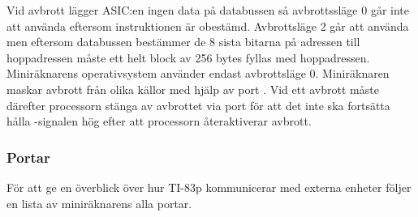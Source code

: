 \documentclass[main.tex]{subfiles}
\begin{document}
Vid avbrott lägger ASIC:en ingen data på databussen så avbrottssläge 0 går inte
att använda eftersom instruktionen är obestämd. Avbrottsläge 2 går att använda
men eftersom databussen bestämmer de 8 sista bitarna på adressen till
hoppadressen måste ett helt block av 256 bytes fyllas med hoppadressen.
Miniräknarens operativsystem använder endast avbrottsläge 0. Miniräknaren
maskar avbrott från olika källor med hjälp av port . Vid ett avbrott
måste därefter processorn stänga av avbrottet via port  för att det
inte ska fortsätta hålla -signalen hög efter att processorn
återaktiverar avbrott.

\subsubsection{Portar}
För att ge en överblick över hur TI-83p kommunicerar med externa enheter följer
en lista av miniräknarens alla portar.
\end{document}
